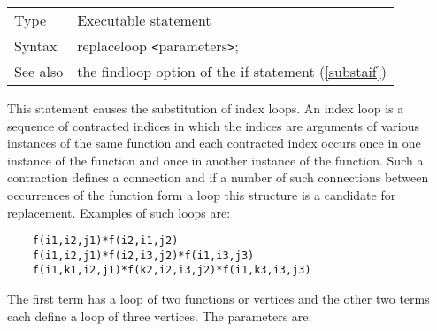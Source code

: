 \noindent \begin{tabular}{ll}
Type & Executable statement\\
Syntax & replaceloop {\tt<}parameters{\tt>};
\\ See also & the findloop option of the if statement (\ref{substaif})
\end{tabular}\vspace{4mm}

\noindent This statement causes the substitution of 
index loops. An index loop is a 
sequence of contracted indices in which the indices are arguments of 
various instances of the same function and each contracted index occurs once in one instance of the 
function and once in another instance of the function. Such a contraction 
defines a connection and if a number of such connections between 
occurrences of the function form a loop this structure is a candidate for 
replacement. Examples of such loops are:
\begin{verbatim}
    f(i1,i2,j1)*f(i2,i1,j2)
    f(i1,i2,j1)*f(i2,i3,j2)*f(i1,i3,j3)
    f(i1,k1,i2,j1)*f(k2,i2,i3,j2)*f(i1,k3,i3,j3)
\end{verbatim}
The first term has a loop of two functions or vertices and 
the other two terms each define a loop of three vertices. The parameters 
are:







